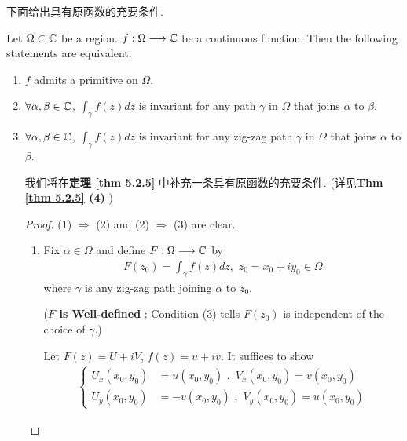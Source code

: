 	\vspace{2em}
	下面给出具有原函数的充要条件.
	\begin{thm}\label{thm 4.1.3}
		Let $\Omega \subset \mathbb{C}$ be a region. $f : \Omega \longrightarrow \mathbb{C}$ be a continuous function. Then the following statements are equivalent:
		\begin{enumerate}
			\item[(1)]$f$ admits a primitive on $\Omega$.
			
			\item[(2)]$\forall \alpha , \beta \in \mathbb{C}$, $\int_{\gamma}{f(z) dz}$ is invariant for any path $\gamma$ in $\Omega$ that joins $\alpha$ to $\beta$.
			
			\item[(3)]$\forall \alpha , \beta \in \mathbb{C}$, $\int_{\gamma}{f(z) dz}$ is invariant for any zig-zag path $\gamma$ in $\Omega$ that joins $\alpha$ to $\beta$.
			
			\vspace{1em}
			\begin{rmk}
				我们将在\textbf{定理 \ref{thm 5.2.5}} 中补充一条具有原函数的充要条件. (详见\textbf{Thm \ref{thm 5.2.5} (4)} )
			\end{rmk}
			
			\vspace{2em}
			\begin{proof}
				(1) $\Rightarrow$ (2) and (2) $\Rightarrow$ (3) are clear.
				\begin{enumerate}
					\item[(3) $\Rightarrow$ (1):]Fix $\alpha \in \Omega$ and define $F : \Omega \longrightarrow \mathbb{C}$ by 
					\begin{align}
						F(z_0) = \int_{\gamma}{f(z) dz} , \,\, z_0 = x_0 + i y_0 \in \Omega
					\end{align}
					where $\gamma$ is any zig-zag path joining $\alpha$ to $z_0$.
					\begin{center}
						(\textbf{$F$ is Well-defined} : Condition (3) tells $F(z_0)$ is independent of the choice of $\gamma$.)
					\end{center}
					
					\vspace{1.5em}
					Let $F(z) = U + i V$, $f(z) = u + i v$. It suffices to show
					\begin{align}
						\begin{cases}
							U_{x}(x_0 , y_0) &= u(x_0 , y_0) \,\, , \,\, V_{x}(x_0 , y_0) = v(x_0 , y_0) \\
							U_{y}(x_0 , y_0) &= -v(x_0 , y_0) \,\, , \,\, V_{y}(x_0 , y_0) = u(x_0 , y_0)
						\end{cases}
					\end{align}
					

\end{enumerate}
\end{proof}
\end{enumerate}
\end{thm}
